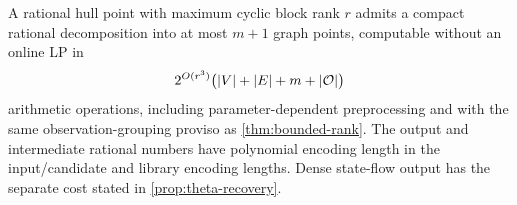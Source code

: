\begin{theorem}\label{thm:rank-recovery}
A rational hull point with maximum cyclic block rank $r$ admits a
compact rational decomposition into at most $m+1$ graph points, computable
without an online LP in
\begin{equation}\label{eq:rank-recovery-complexity}
 2^{O(r^3)}\bigl(|V|+|E|+m+|\mathcal O|\bigr)
\end{equation}
arithmetic operations, including parameter-dependent preprocessing and
with the same observation-grouping proviso as
\cref{thm:bounded-rank}. The output and intermediate rational numbers
have polynomial encoding length in the input/candidate and library
encoding lengths. Dense state-flow output has the separate cost stated
in \cref{prop:theta-recovery}.
\end{theorem}
